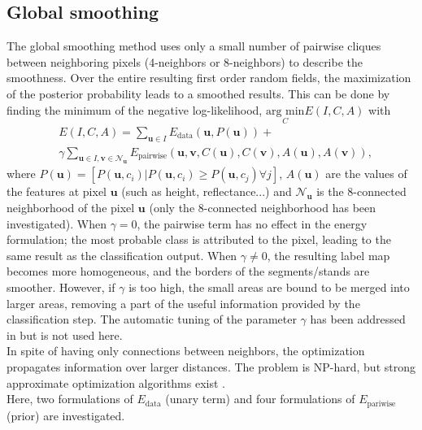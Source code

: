 \subsection{Global smoothing}
The global smoothing method uses only a small number of pairwise cliques between neighboring pixels (4-neighbors or 8-neighbors) to describe the smoothness. Over the entire resulting first order random fields, the maximization of the posterior probability leads to a smoothed results. This can be done by finding the minimum of the negative log-likelihood, $\underset{C}{\text{arg min}}E(I,C,A)$ with
\begin{equation}
\begin{aligned}
& E(I,C,A)=\sum_{\mathbf{u}\in I}E_{\text{data}}(\mathbf{u},P(\mathbf{u})) + \\
& \gamma\sum_{\mathbf{u} \in I, \mathbf{v} \in \mathcal{N}_{\mathbf{u}}} E_{\text{pairwise}}(\mathbf{u}, \mathbf{v}, C(\mathbf{u}), C(\mathbf{v}), A(\mathbf{u}), A(\mathbf{v})),
\end{aligned}
\end{equation}
where $P(\mathbf{u})=[P(\mathbf{u},c_{i})|P(\mathbf{u},c_{i}) \geq P(\mathbf{u},c_{j}) \forall j]$, $A(\mathbf{u})$ are the values of the features at pixel $\mathbf{u}$ (such as height, reflectance...) and $\mathcal{N}_{\mathbf{u}}$ is the 8-connected neighborhood of the pixel $\mathbf{u}$ (only the 8-connected neighborhood has been investigated). When $\gamma=0$, the pairwise term has no effect in the energy formulation; the most probable class is attributed to the pixel, leading to the same result as the classification output. When $\gamma \neq 0$, the resulting label map becomes more homogeneous, and the borders of the segments/stands are smoother. However, if $\gamma$ is too high, the small areas are bound to be merged into larger areas, removing a part of the useful information provided by the classification step. The automatic tuning of the parameter $\gamma$ has been addressed in \cite{Gab_MRF} but is not used here.\\

In spite of having only connections between neighbors, the optimization propagates information over larger distances. The problem is NP-hard, but strong approximate optimization algorithms exist \citep{boykov2001fast, kolmogorov2006convergent, felzenszwalb2006efficient}. \\

Here, two formulations of $E_{\text{data}}$ (unary term) and four formulations of $E_{\text{pariwise}}$ (prior) are investigated. \\
